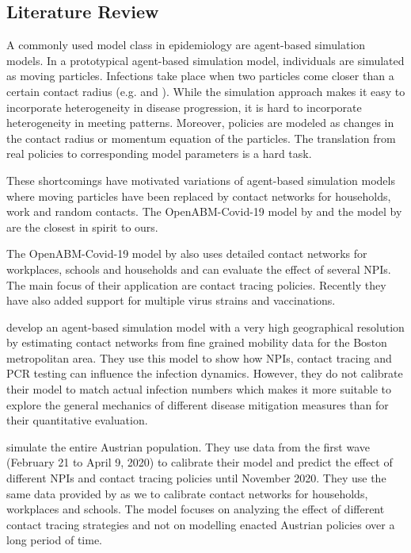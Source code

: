 \subsection{Literature Review}
\label{sec:literature_review}

A commonly used model class in epidemiology are agent-based simulation
models. In a prototypical agent-based simulation model, individuals are
simulated as moving particles. Infections take place when two particles come closer than
a certain contact radius (e.g. \citet{Silva2020} and \citet{Cuevas2020}). While the
simulation approach makes it easy to incorporate heterogeneity in disease progression, it
is hard to incorporate heterogeneity in meeting patterns. Moreover, policies are modeled
as changes in the contact radius or momentum equation of the particles. The translation
from real policies to corresponding model parameters is a hard task.

These shortcomings have motivated variations of agent-based simulation models where
moving particles have been replaced by contact networks for households, work and random
contacts. The OpenABM-Covid-19 model by \citet{Hinch2021} and the model by
\citet{Aleta2020} are the closest in spirit to ours.


The OpenABM-Covid-19 model by \citet{Hinch2021} also uses detailed contact networks for
workplaces, schools and households and can evaluate the effect of several NPIs. The main
focus of their application are contact tracing policies. Recently they have also added
support for multiple virus strains and vaccinations.

\citet{Aleta2020} develop an agent-based simulation model with a very high geographical
resolution by estimating contact networks from fine grained mobility data for the
Boston metropolitan area. They use this model to show how NPIs, contact tracing and PCR
testing can influence the infection dynamics. However, they do not calibrate their model
to match actual infection numbers which makes it more suitable to explore the general
mechanics of different disease mitigation measures than for their quantitative
evaluation.

\citet{Bicher2021} simulate the entire Austrian population. They use data from the first
wave (February 21 to April 9, 2020) to calibrate their model and predict the effect of
different NPIs and contact tracing policies until November 2020. They use the same data
provided by \citet{Mossong2008} as we to calibrate contact networks for households,
workplaces and schools. The model focuses on analyzing the effect of different contact
tracing strategies and not on modelling enacted Austrian policies over a long period
of time.

